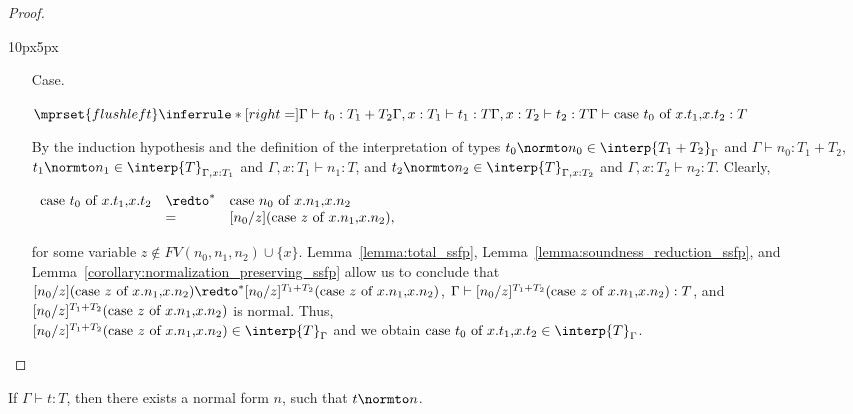 \begin{proof}
\begin{changemargin}{10px}{5px}
\begin{itemize}
\item[Case.]\ \\
  \begin{center}
    \begin{math}
      $$\mprset{flushleft}
      \inferrule* [right=] {
        \Gamma \vdash t_0:T_1 + T_2
        \\
	\Gamma,x:T_1 \vdash t_1:T
        \\
	\Gamma,x:T_2 \vdash t_2:T
      }{\Gamma \vdash \ccon{t_0}{x}{t_1}{t_2}: T}
    \end{math}
  \end{center}
  By the induction hypothesis and the definition of the interpretation of types
  $t_0 \normto n_0 \in \interp{T_1 + T_2}_\Gamma$ and $\Gamma \vdash n_0:T_1+T_2$, 
  $t_1 \normto n_1 \in \interp{T}_{\Gamma,x:T_1}$ and $\Gamma,x:T_1 \vdash n_1:T$, and
  $t_2 \normto n_2 \in \interp{T}_{\Gamma,x:T_2}$ and  $\Gamma,x:T_2 \vdash n_2:T$.  
  Clearly, 
  \begin{center}
    \begin{math}
      \begin{array}{lll}
        \ccon{t_0}{x}{t_1}{t_2} & \redto^* & \ccon{n_0}{x}{n_1}{n_2}\\
        & =        & [n_0/z](\ccon{z}{x}{n_1}{n_2}),
      \end{array}
    \end{math}
  \end{center}
  for some variable $z \not \in FV(n_0,n_1,n_2) \cup \{x\}$.  Lemma~\ref{lemma:total_ssfp}, 
  Lemma~\ref{lemma:soundness_reduction_ssfp}, and Lemma~\ref{corollary:normalization_preserving_ssfp} 
  allow us to conclude that $[n_0/z](\ccon{z}{x}{n_1}{n_2}) \redto^* [n_0/z]^{T_1+T_2}(\ccon{z}{x}{n_1}{n_2})$,
  $\Gamma \vdash [n_0/z]^{T_1+T_2}(\mbox{case}\ z\ \text{of}\ x\text{.}n_1\text{,}x\text{.}n_2) :T$, and $[n_0/z]^{T_1+T_2}(\mbox{case}\ z\ \text{of}\ x\text{.}n_1\text{,}x\text{.}n_2)$
  is normal.  Thus, \\ $[n_0/z]^{T_1+T_2}(\ccon{z}{x}{n_1}{n_2}) \in \interp{T}_\Gamma$ and we obtain 
  $\ccon{t_0}{x}{t_1}{t_2} \in \interp{T}_\Gamma$. 
\end{itemize}
\end{changemargin}
\end{proof}

\begin{corollary}[Normalization]
  If $\Gamma \vdash t:T$, then there exists a normal form $n$, such
  that $t \normto n$.
\end{corollary}

